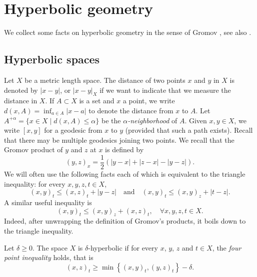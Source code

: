 \section{Hyperbolic geometry}

We collect some facts on hyperbolic geometry in the sense of Gromov \cite{gromov_hyperbolic_1987}, see also \cite{coornaert_geometry_1990,ghys_hyperboliques_1990}.

\subsection{Hyperbolic spaces}
\label{sec: Hyperbolic spaces}

Let $X$ be a metric length space. The distance of two points $x$ and $y$ in $X$ is denoted by $|x-y|$, or $|x-y|_X$ if we want to indicate that we measure the distance in $X$. If $A\subset X$ is a set and $x$ a point, we write $d(x,A)=\inf_{a\in A}|x-a|$ to denote the distance from $x$ to $A$.
Let $A^{+\alpha}=\{x\in X\mid d(x,A) \leqslant \alpha\}$ be the \emph{$\alpha$-neighborhood} of $A$.
Given $x, y \in X$, we write $[x,y]$ for a geodesic from $x$ to $y$ (provided that such a path exists).
Recall that there may be multiple geodesics joining two points.
We recall that the Gromov product of $y$ and $z$ at $x$ is defined by
\[
(y,z)_x=\frac{1}{2}\left( |y-x| + |z-x| - |y-z|\right).
\]
We will often use the following facts each of which is equivalent to the triangle inequality: for every $x,y,z,t \in X$,
\begin{equation*}
(x,y)_t \leq (x,z)_t + |y - z|
\quad \text{and} \quad
(x,y)_t \leq (x,y)_z + |t-z|.
\end{equation*}
A similar useful inequality is
\begin{equation}
\label{eqn: triangle inequality gromov product}
(x,y)_t \leq (x,y)_z + (x,z)_t, \quad \forall x,y,z,t \in X.
\end{equation}
Indeed, after unwrapping the definition of Gromov's products, it boils down to the triangle inequality.

\begin{df}
Let $\delta\geqslant 0$. The space $X$ is $\delta$-hyperbolic if for every $x$, $y$, $z$ and $t\in X$, the \emph{four point inequality} holds, that is
\begin{equation}
\label{eqn: four point inequality}
(x,z)_t\geqslant \min \left\{ (x,y)_t,(y,z)_t\right\}- \delta.
\end{equation}
\end{df}

